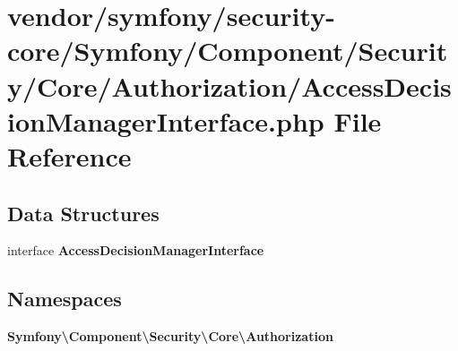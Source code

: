 \section{vendor/symfony/security-\/core/\+Symfony/\+Component/\+Security/\+Core/\+Authorization/\+Access\+Decision\+Manager\+Interface.php File Reference}
\label{_access_decision_manager_interface_8php}
\subsection*{Data Structures}
\begin{DoxyCompactItemize}
\item 
interface {\bf Access\+Decision\+Manager\+Interface}
\end{DoxyCompactItemize}
\subsection*{Namespaces}
\begin{DoxyCompactItemize}
\item 
 {\bf Symfony\textbackslash{}\+Component\textbackslash{}\+Security\textbackslash{}\+Core\textbackslash{}\+Authorization}
\end{DoxyCompactItemize}
